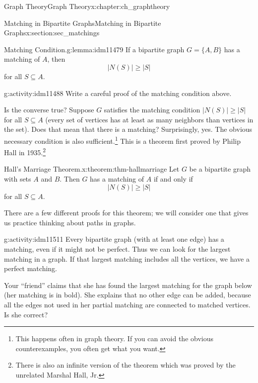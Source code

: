 \documentclass[oneside,10pt,]{book}
\numberwithin{equation}{chapter}
\begin{document}
\begin{chapterptx}{Graph Theory}{}{Graph Theory}{}{}{x:chapter:ch_graphtheory}
\begin{sectionptx}{Matching in Bipartite Graphs}{}{Matching in Bipartite Graphs}{}{}{x:section:sec_matchings}
\begin{lemma}{Matching Condition.}{}{g:lemma:idm11479}%
 If a bipartite graph \(G = \{A, B\}\) has a matching of \(A\), then%
\begin{equation*}
|N(S)| \ge |S|
\end{equation*}
for all \(S \subseteq A\).%
\end{lemma}
\begin{activity}{}{g:activity:idm11488}%
Write a careful proof of the matching condition above.%
\end{activity}
Is the converse true? Suppose \(G\) satisfies the matching condition \(|N(S)| \ge |S|\) for all \(S \subseteq A\) (every set of vertices has at least as many neighbors than vertices in the set). Does that mean that there is a matching? Surprisingly, yes. The obvious necessary condition is also sufficient.\footnote{This happens often in graph theory.  If you can avoid the obvious counterexamples, you often get what you want.\label{g:fn:idm11495}} This is a theorem first proved by Philip Hall in 1935.\footnote{There is also an infinite version of the theorem which was proved by the unrelated Marshal Hall, Jr.\label{g:fn:idm11496}}%
\begin{theorem}{Hall's Marriage Theorem.}{}{x:theorem:thm-hallmarriage}%
 Let \(G\) be a bipartite graph with sets \(A\) and \(B\). Then \(G\) has a matching of \(A\) if and only if%
\begin{equation*}
|N(S)| \ge |S|
\end{equation*}
for all \(S \subseteq A\).%
\end{theorem}
There are a few different proofs for this theorem; we will consider one that gives us practice thinking about paths in graphs.%
\begin{activity}{}{g:activity:idm11511}%
Every bipartite graph (with at least one edge) has a matching, even if it might not be perfect.  Thus we can look for the largest matching in a graph.  If that largest matching includes all the vertices, we have a perfect matching.%
\par
Your ``friend'' claims that she has found the largest matching for the graph below (her matching is in bold). She explains that no other edge can be added, because all the edges not used in her partial matching are connected to matched vertices. Is she correct?%
\begin{sidebyside}{1}{0.3}{0.3}{0}%
\begin{sbspanel}{0.4}%
\resizebox{\linewidth}{!}{%
}
\end{sbspanel}
\end{sidebyside}
\end{activity}
\end{sectionptx}
\end{chapterptx}
\end{document}
